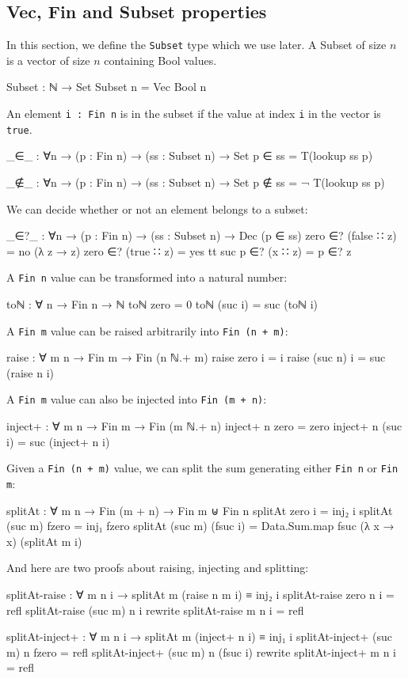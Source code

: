 \subsection{Vec, Fin and Subset properties}
In this section, we define the \texttt{Subset} type which we use later. A Subset of size $n$ is a vector of size $n$ containing Bool values.
\begin{agda}
Subset : ℕ → Set
Subset n = Vec Bool n
\end{agda}
An element \texttt{i : Fin n} is in the subset if the value at index \texttt{i} in the vector is \texttt{true}. 
\begin{agda}
_∈_ : ∀{n} → (p : Fin n) → (ss : Subset n) → Set
p ∈ ss = T(lookup ss p)

_∉_ : ∀{n} → (p : Fin n) → (ss : Subset n) → Set
p ∉ ss = ¬ T(lookup ss p)
\end{agda}
We can decide whether or not an element belongs to a subset: 
\begin{agda}
_∈?_ : ∀{n} → (p : Fin n) → (ss : Subset n) → Dec (p ∈ ss)
zero  ∈? (false ∷ z) = no (λ z → z)
zero  ∈? (true ∷ z)  = yes tt
suc p ∈? (x ∷ z)     = p ∈? z
\end{agda}
A \texttt{Fin n} value can be transformed into a natural number:
\begin{agda}
toℕ : ∀ {n} → Fin n → ℕ
toℕ zero    = 0
toℕ (suc i) = suc (toℕ i)
\end{agda}
A \texttt{Fin m} value can be raised arbitrarily into \texttt{Fin (n + m)}:
\begin{agda}
raise : ∀ {m} n → Fin m → Fin (n ℕ.+ m)
raise zero    i = i
raise (suc n) i = suc (raise n i)

\end{agda}
A \texttt{Fin m} value can also be injected into \texttt{Fin (m + n)}:
\begin{agda}
inject+ : ∀ {m} n → Fin m → Fin (m ℕ.+ n)
inject+ n zero    = zero
inject+ n (suc i) = suc (inject+ n i)
\end{agda}
Given a \texttt{Fin (n + m)} value, we can split the sum generating either \texttt{Fin n} or \texttt{Fin m}:
\begin{agda}
splitAt : ∀ m {n} → Fin (m + n) → Fin m ⊎ Fin n
splitAt zero    i        = inj₂ i
splitAt (suc m) fzero    = inj₁ fzero
splitAt (suc m) (fsuc i) = Data.Sum.map fsuc (λ x → x) (splitAt m i)
\end{agda}
And here are two proofs about raising, injecting and splitting:
\begin{agda}
splitAt-raise : ∀ m n i → splitAt m (raise {n} m i) ≡ inj₂ i
splitAt-raise zero    n i = refl
splitAt-raise (suc m) n i 
  rewrite splitAt-raise m n i = refl

splitAt-inject+ : ∀ m n i → splitAt m (inject+ n i) ≡ inj₁ i
splitAt-inject+ (suc m) n fzero = refl
splitAt-inject+ (suc m) n (fsuc i) 
  rewrite splitAt-inject+ m n i = refl
\end{agda}